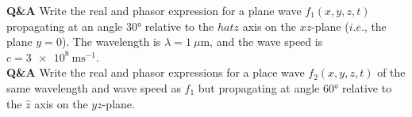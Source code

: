 \documentclass[main.tex]{subfiles}
\begin{document}
\textbf{Q\&A} Write the real and phasor expression for a plane wave $f_1(x,y,z,t)$ propagating at an angle $\ang{30}$ relative to the $hat{z}$ axis on the $xz$-plane ($i.e.$, the plane $y=0$). The wavelength is $\lambda = \SI{1}{\mu \meter}$, and the wave speed is $c = \SI{3e8}{\metre \second^{-1}}$.\\

\textbf{Q\&A} Write the real and phasor expressions for a place wave $f_2(x,y,z,t)$ of the same wavelength and wave speed as $f_1$ but propagating at angle $\ang{60}$ relative to the $\hat{z}$ axis on the $yz$-plane.
\end{document}
